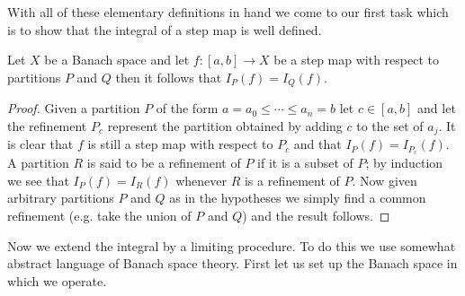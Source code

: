 With all of these elementary definitions in hand we come to our first
task which is to show that the integral of a step map is well defined.
\begin{prop}Let $X$ be a Banach space and let $f : [a,b] \to X$ be a
  step map with respect to partitions $P$ and $Q$ then it follows that
  $I_P(f) = I_Q(f)$.
\end{prop}
\begin{proof}
Given a partition $P$ of the form $a=a_0 \leq \dotsb \leq a_n=b$ let
$c \in [a,b]$ and let the refinement $P_c$ represent the partition
obtained by adding $c$ to the set of $a_j$.  It is clear that $f$ is
still a step map with respect to $P_c$ and that $I_P(f)
= I_{P_c}(f)$.  A partition $R$ is said to be a refinement of $P$ if
it is a subset of $P$; by induction we see that $I_P(f) = I_R(f)$
whenever $R$ is a refinement of $P$.  Now given arbitrary partitions
$P$ and $Q$ as in the hypotheses we simply find a common refinement
(e.g. take the union of $P$ and $Q$) and the result follows.
\end{proof}

Now we extend the integral by a limiting procedure.  To do this we use 
somewhat abstract language of Banach space theory.  First let us set
up the Banach space in which we operate.

